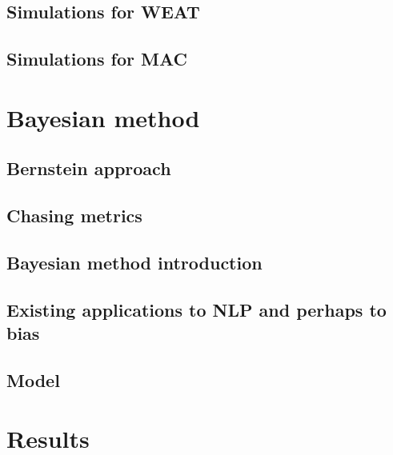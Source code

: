 \documentclass[
  10pt,
  dvipsnames,enabledeprecatedfontcommands, twocolumn]{scrartcl}
\begin{document}
\hypertarget{simulations-for-weat}{%
\subsection{Simulations for WEAT}\label{simulations-for-weat}}

\hypertarget{simulations-for-mac}{%
\subsection{Simulations for MAC}\label{simulations-for-mac}}

\hypertarget{bayesian-method}{%
\section{Bayesian method}\label{bayesian-method}}

\hypertarget{bernstein-approach}{%
\subsection{Bernstein approach}\label{bernstein-approach}}

\hypertarget{chasing-metrics}{%
\subsection{Chasing metrics}\label{chasing-metrics}}

\hypertarget{bayesian-method-introduction}{%
\subsection{Bayesian method
introduction}\label{bayesian-method-introduction}}

\hypertarget{existing-applications-to-nlp-and-perhaps-to-bias}{%
\subsection{Existing applications to NLP and perhaps to
bias}\label{existing-applications-to-nlp-and-perhaps-to-bias}}

\hypertarget{model}{%
\subsection{Model}\label{model}}

\hypertarget{results}{%
\section{Results}\label{results}}
\end{document}
